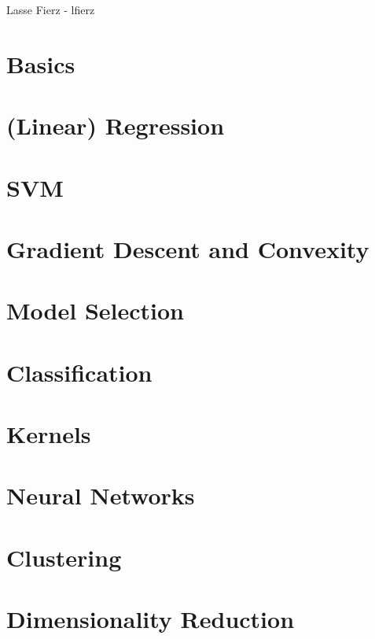 


    \begin{multicols*}{4}

        {Lasse Fierz - lfierz}
        
            \section{Basics}
            
            \section{(Linear) Regression}
            
            \section{SVM}
            
            \section{Gradient Descent and Convexity}
            
            \section{Model Selection}
            
            \section{Classification}
            
            \section{Kernels}
            
            \section{Neural Networks}
            
            \section{Clustering}
            
            \section{Dimensionality Reduction}
            

\end{multicols*}
